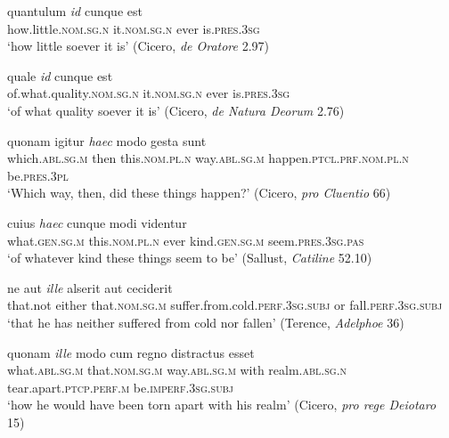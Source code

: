 \begin{exe}
\ex
\gll quantulum \emph{id} cunque est\\
how.little.\textsc{nom.sg.n} it.\textsc{nom.sg.n} ever is.\textsc{pres.3sg}\\
\trans `how little soever it is' (Cicero, \textit{de Oratore} 2.97) 
\label{enclitic7}
\end{exe}

\begin{exe}
\ex
\gll quale \emph{id} cunque est\\
of.what.quality.\textsc{nom.sg.n} it.\textsc{nom.sg.n} ever is.\textsc{pres.3sg}\\
\trans `of what quality soever it is' (Cicero, \textit{de Natura Deorum} 2.76) 
\label{enclitic8}
\end{exe}

\begin{exe}
\ex
\gll quonam igitur \emph{haec} modo gesta sunt\\
which.\textsc{abl.sg.m} then this.\textsc{nom.pl.n} way.\textsc{abl.sg.m} happen.\textsc{ptcl.prf.nom.pl.n} be.\textsc{pres.3pl}\\
\trans `Which way, then, did these things happen?' (Cicero, \textit{pro Cluentio} 66) 
\label{enclitic9}
\end{exe}

\begin{exe}
\ex
\gll cuius \emph{haec} cunque modi videntur\\
what.\textsc{gen.sg.m} this.\textsc{nom.pl.n} ever kind.\textsc{gen.sg.m} seem.\textsc{pres.3sg.pas}\\
\trans `of whatever kind these things seem to be' (Sallust, \textit{Catiline} 52.10) 
\label{enclitic10}
\end{exe}

\begin{exe}
\ex
\gll ne aut \emph{ille} alserit aut ceciderit\\
that.not either that.\textsc{nom.sg.m} suffer.from.cold.\textsc{perf.3sg.subj} or fall.\textsc{perf.3sg.subj}\\
\trans `that he has neither suffered from cold nor fallen' (Terence, \textit{Adelphoe} 36) 
\label{enclitic11}
\end{exe}

\begin{exe}
\ex
\gll quonam \emph{ille} modo cum regno distractus esset\\
what.\textsc{abl.sg.m} that.\textsc{nom.sg.m} way.\textsc{abl.sg.m} with realm.\textsc{abl.sg.n} tear.apart.\textsc{ptcp.perf.m} be.\textsc{imperf.3sg.subj}\\
\trans `how he would have been torn apart with his realm' (Cicero, \textit{pro rege Deiotaro} 15) 
\label{enclitic12}
\end{exe}

